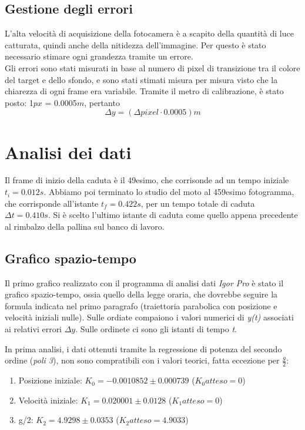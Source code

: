 \documentclass[12pt, a4paper]{article}
\begin{document}
\subsection{Gestione degli errori}
L'alta velocità di acquisizione della fotocamera è a scapito della quantità di luce catturata, quindi anche della nitidezza dell'immagine. Per questo è stato necessario stimare ogni grandezza tramite un errore. \\
Gli errori sono stati misurati in base al numero di pixel di transizione tra il colore del target e dello sfondo, e sono stati stimati misura per misura visto che la chiarezza di ogni frame era variabile. Tramite il metro di calibrazione, è stato posto: 1$px$ = 0.0005$m$, pertanto
\begin{equation*}
    \Delta y= (\Delta pixel \cdot 0.0005)m
\end{equation*}


\section{Analisi dei dati}
Il frame di inizio della caduta è il 49esimo, che corrisonde ad un tempo iniziale \textit{$t_i = 0.012s$}.
Abbiamo poi terminato lo studio del moto al 459esimo fotogramma, che corrisponde all'istante \textit{$t_f = 0.422s$}, per un tempo totale di caduta \textit{$\Delta t = 0.410s$}. 
Si è scelto l'ultimo istante di caduta come quello appena precedente al rimbalzo della pallina sul banco di lavoro.


\subsection{Grafico spazio-tempo}
Il primo grafico realizzato con il programma di analisi dati \textit{Igor Pro} è stato il grafico spazio-tempo, ossia quello della legge oraria, che dovrebbe seguire la formula indicata nel primo paragrafo (traiettoria parabolica con posizione e velocità iniziali nulle). 
Sulle ordiate compaiono i valori numerici di \textit{y(t)} associati ai relativi errori  \textit{$\Delta y$}. Sulle ordinete ci sono gli istanti di tempo \textit{t}. 

In prima analisi, i dati ottenuti tramite la regressione di potenza del secondo ordine (\textit{poli 3}), non sono compratibili con i valori teorici, fatta eccezione per $\frac{g}{2}$:


\renewcommand{\theenumii}{\roman{enumii}}
    \begin{enumerate}
    \itemsep0em 
        \item Posizione iniziale: $K_0 = -0.0010852 \pm 0.000739$ ($K_0atteso = 0$)
        \item Velocità iniziale:  $K_1 =  0.020001 \pm 0.0128$ ($K_1atteso = 0$)
        \item g/2:                $K_2 =  4.9298 \pm 0.0353$ ($K_2atteso = 4.9033$)
    \end{enumerate}
\end{document}
